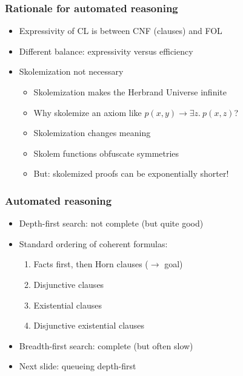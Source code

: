 \documentclass[handout,11pt]{beamer}
\newcommand{\weg}[1]{}
\begin{document}
\begin{frame}
\frametitle{Rationale for automated reasoning}
 \begin{itemize}[<+->] %
    \item Expressivity of CL is between CNF (clauses) and FOL
    \item Different balance: expressivity versus efficiency
    \item Skolemization not necessary
    \begin{itemize}
       \item Skolemization makes the Herbrand Universe infinite
       \item Why skolemize an axiom like $p(x,y)\to\exists z.~p(x,z)$?
       \item Skolemization changes meaning
       \item Skolem functions obfuscate symmetries
       \item \alert{But: skolemized proofs can be exponentially shorter!}
    \end{itemize}
 \end{itemize}
\end{frame}

\weg{
\begin{frame}
\frametitle{Example: DP closed under reflexive closure}
\small
\end{frame}

\frame
  {    
    \frametitle{Search space} \vspace*{-.95in}
    \scalebox{0.40}
      {
    \texttt{[image: tree\_dpe]}
      }
  }
}%

\begin{frame}
\frametitle{Automated reasoning}
 \begin{itemize}[<+->]   %
    \item Depth-first search: not complete (but quite good)
    \item Standard ordering of coherent formulas:
    \begin{enumerate}
       \item Facts first, then Horn clauses ($\to$ goal)
       \item Disjunctive clauses
       \item Existential clauses
       \item Disjunctive existential clauses
    \end{enumerate}
    \item Breadth-first search: complete (but often slow)
    \item Next slide: queueing depth-first
 \end{itemize}
\end{frame}
\end{document}
